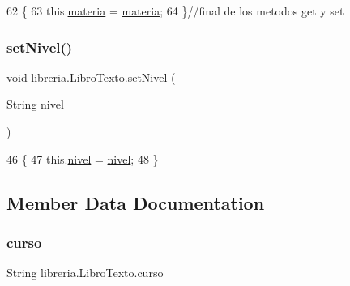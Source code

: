 \begin{DoxyCode}
62                                            \{
63         this.\mbox{\hyperlink{classlibreria_1_1_libro_texto_aed34f3bc7feec9962c4877156fb6ae0c}{materia}} = \mbox{\hyperlink{classlibreria_1_1_libro_texto_aed34f3bc7feec9962c4877156fb6ae0c}{materia}};
64     \}\textcolor{comment}{//final de los metodos get y set}
\end{DoxyCode}
\mbox{\label{classlibreria_1_1_libro_texto_a35005b0bb8c95a727d6bf884e85167de}} 
\subsubsection{\texorpdfstring{set\+Nivel()}{setNivel()}}
{\footnotesize\ttfamily void libreria.\+Libro\+Texto.\+set\+Nivel (\begin{DoxyParamCaption}\item[{String}]{nivel }\end{DoxyParamCaption})\hspace{0.3cm}{\ttfamily [inline]}}


\begin{DoxyCode}
46                                        \{
47         this.\mbox{\hyperlink{classlibreria_1_1_libro_texto_a176cfd7d4cd77048392188fa39a444b9}{nivel}} = \mbox{\hyperlink{classlibreria_1_1_libro_texto_a176cfd7d4cd77048392188fa39a444b9}{nivel}};
48     \}
\end{DoxyCode}


\subsection{Member Data Documentation}
\mbox{\label{classlibreria_1_1_libro_texto_a8ca1aa8329b1cc51b986d7826c25ee10}} 
\subsubsection{\texorpdfstring{curso}{curso}}
{\footnotesize\ttfamily String libreria.\+Libro\+Texto.\+curso\hspace{0.3cm}{\ttfamily [private]}}

